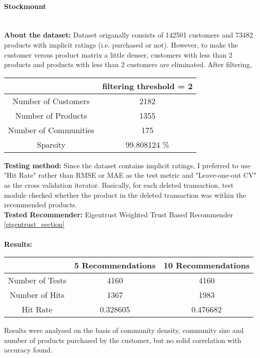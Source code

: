	\paragraph{Stockmount} \mbox{}\\
	\textbf{About the dataset:} Dataset origanally consists of 142501 customers and 73482 products with implicit ratings (i.e. purchased or not). However, to make the customer versus product matrix a little denser, customers with less than 2 products and products with less than 2 customers are eliminated. After filtering,
	\begin{center}
		\begin{tabular}{ | c | c |}
			\hline
			& filtering threshold = 2\\ 
			\hline
			Number of Customers & 2182\\  
			\hline
			Number of Products & 1355\\  
			\hline
			Number of Communities & 175\\  
			\hline
			Sparsity & 99.808124 \% \\   
			\hline
		\end{tabular}
	\end{center} 
	\vspace{0.5cm}
	\textbf{Testing method:} Since the dataset contains implicit ratings, I preferred to use "Hit Rate" rather than RMSE or MAE as the test metric and "Leave-one-out CV" as the cross validation iterator. Basically, for each deleted transaction, test module checked whether the product in the deleted transaction was within the recommended products.\\
	\textbf{Tested Recommender:} Eigentrust Weighted Trust Based Recommender \ref{eigentrust_section} \\ \\
	\textbf{Results:}
	\begin{center}
		\begin{tabular}{ | c | c | c |}
			\hline
			& 5 Recommendations & 10 Recommendations\\ 
			\hline
			Number of Tests&  4160 & 4160\\  
			\hline
			Number of Hits&  1367 & 1983\\  
			\hline
			Hit Rate &   0.328605 & 0.476682\\  
			\hline
		\end{tabular}
	\end{center} 
	Results were analysed on the basis of community density, community size and number of products purchased by the customer, but no solid correlation with accuracy found.
	
